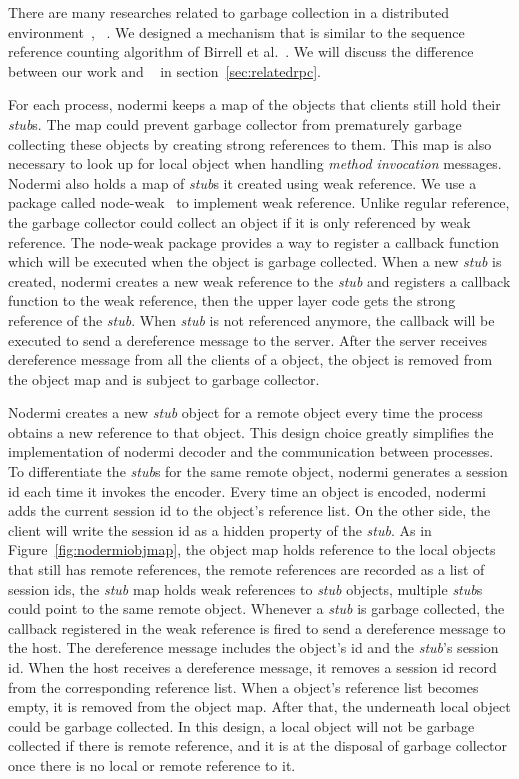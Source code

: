 There are many researches related to garbage collection in a distributed
environment~\cite{abdullahi1998garbage}, ~\cite{birrell1993distributed}.
We designed a mechanism that is similar to the sequence reference counting algorithm
of Birrell et al.~\cite{birrell1993distributed}.
We will discuss the difference between our work and ~\cite{birrell1993distributed}
in section~\ref{sec:relatedrpc}.

For each process, nodermi keeps a map of the objects that clients still hold
their \emph{stub}s.
The map could prevent garbage collector from prematurely garbage collecting
these objects by creating strong references to them.
This map is also necessary to look up for local object when handling \emph{method invocation} messages.
Nodermi also holds a map of \emph{stub}s it created using weak reference.
We use a \nodejs{} package called node-weak~\cite{nodeweak} to implement weak reference.
Unlike regular reference, the garbage collector could collect an object if it is only
referenced by weak reference.
The node-weak package provides a way to register a callback function which will
be executed when the object is garbage collected.
When a new \emph{stub} is created, nodermi creates a new weak reference to
the \emph{stub} and registers a callback function to the weak reference,
then the upper layer code gets the strong reference of the \emph{stub}.
When \emph{stub} is not referenced anymore,
the callback will be executed to send a dereference message to the server.
After the server receives dereference message from all the clients of a object,
the object is removed from the object map and is subject to garbage collector.


\nodrmiobjmapfig{}

Nodermi creates a new \emph{stub} object for a remote object every time
the process obtains a new reference to that object.
This design choice greatly simplifies the implementation of nodermi decoder and
the communication between processes.
To differentiate the \emph{stub}s for the same remote object,
nodermi generates a session id each time it invokes the encoder.
Every time an object is encoded, nodermi adds the current session id
to the object's reference list.
On the other side,
the client will write the session id as a hidden property of the \emph{stub}.
As in Figure~\ref{fig:nodermiobjmap}, the object map holds reference to
the local objects that still has remote references,
the remote references are recorded as a list of session ids,
the \emph{stub} map holds weak references to \emph{stub} objects,
multiple \emph{stub}s could point to the same remote object.
Whenever a \emph{stub} is garbage collected,
the callback registered in the weak reference is fired to send a dereference message
to the host.
The dereference message includes the object's id and the \emph{stub}'s session id.
When the host receives a dereference message, it removes a session id record from
the corresponding reference list.
When a object's reference list becomes empty, it is removed from the object map.
After that, the underneath local object could be garbage collected.
In this design, a local object will not be garbage collected if there is
remote reference, and it is at the disposal of garbage collector once there is
no local or remote reference to it.

